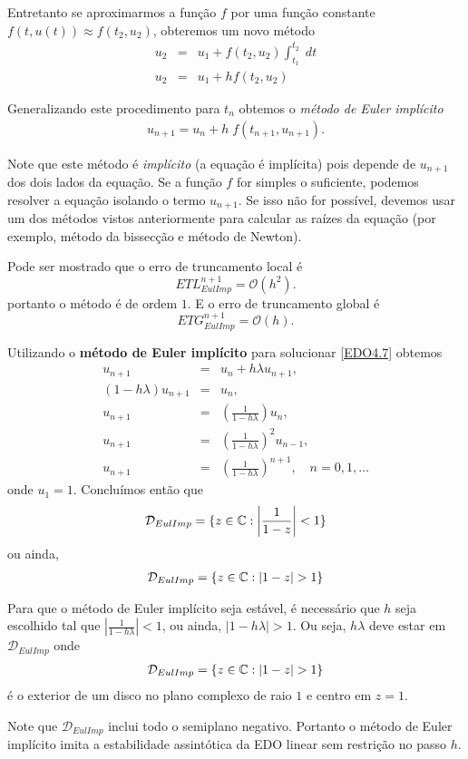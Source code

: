 Entretanto se aproximarmos a função $f$ por uma função constante $f(t,u(t)) \approx  f(t_2,u_2)$, obteremos um novo método
\begin{eqnarray}
  u_2 &=&  u_1 + f(t_2,u_2) \int _{t_1}^{t_2}  \; dt \\
  u_2 &=&  u_1 + h f(t_2,u_2)
\end{eqnarray}


Generalizando este procedimento para $t_n$ obtemos o \emph{método de Euler implícito}
\begin{eqnarray}
u_{n+1}=u_n + h\;f(t_{n+1},u_{n+1}).
\end{eqnarray}

Note que este método é \emph{implícito} (a equação é implícita) pois depende de $u_{n+1}$ dos dois lados da equação. Se a função $f$ for simples o suficiente, podemos resolver a equação isolando o termo $u_{n+1}$. Se isso não for possível, devemos usar um dos métodos vistos anteriormente para calcular as raízes da equação (por exemplo, método da bissecção e método de Newton).



Pode ser mostrado que o erro de truncamento local é
$$ETL_{EulImp}^{n+1}= \mathcal{O}(h^2).$$
portanto o método é de ordem $1$. E o erro de truncamento global é
$$ETG_{EulImp}^{n+1}= \mathcal{O}(h).$$



\begin{ex}
Utilizando o \textbf{método de Euler implícito} para solucionar \eqref{EDO4.7} obtemos
\begin{eqnarray}
 u_{n+1}      &=& u_n+h\lambda u_{n+1}, \\
 (1-h\lambda )u_{n+1} & =& u_n, \\
       u_{n+1} & =& \left(\frac{1}{1- h\lambda }\right)u_n, \\
       u_{n+1} & =& \left(\frac{1}{1- h\lambda }\right)^2u_{n-1}, \\
       u_{n+1} & =& \left(\frac{1}{1- h\lambda }\right)^{n+1}, \quad  n=0,1,\ldots
\end{eqnarray}
onde $u_1=1$.
Concluímos então que
\begin{eqnarray}
 \mathcal D_{EulImp} = \{z \in  \mathbb{C}:  \left|\frac{1}{1- z}\right|<1\}
\end{eqnarray}
ou ainda,
\begin{eqnarray}
 \mathcal D_{EulImp} = \{z \in  \field{C}:  |1- z|>1\}
\end{eqnarray}

Para que o método de Euler implícito seja estável, é necessário que $h$ seja escolhido tal que $\left|\frac{1}{1- h\lambda }\right|<1$, ou ainda, $|1-h\lambda |>1$. Ou seja, $h\lambda $ deve estar em $\mathcal D_{EulImp}$ onde
\begin{eqnarray}
 \mathcal D_{EulImp} = \{z \in  \field{C}: |1-z|>1\}
\end{eqnarray}
é o exterior de um disco no plano complexo de raio $1$ e centro em $z=1$.

Note que $\mathcal D_{EulImp}$ inclui todo o semiplano negativo. Portanto o método de Euler implícito imita a estabilidade assintótica da EDO linear sem restrição no passo $h$.

\end{ex}

